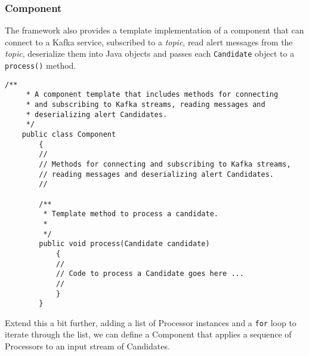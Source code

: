 \documentclass{article}
\newcommand{\kftopic} {\textit{topic}\xspace}
\newcommand{\deserz}    {deserialize\xspace}
\newcommand{\javaname}[1] {{\ttfamily\color{codeblue} #1}}
\newcommand{\javaplural}[1] {\javaname{#1}s}
\begin{document}
\subsubsection{Component}
\label{java-interfaces.Component}

The framework also provides a template implementation of a component that can connect to a Kafka service, subscribed to a \kftopic, read alert messages from the \kftopic, \deserz them into Java objects and passes each \texttt{Candidate} object to a \texttt{process()} method.

\begin{lstlisting}[style=Java]
    /**
     * A component template that includes methods for connecting
     * and subscribing to Kafka streams, reading messages and
     * deserializing alert Candidates.
     */
    public class Component
        {
        //
        // Methods for connecting and subscribing to Kafka streams,
        // reading messages and deserializing alert Candidates.
        //

        /**
         * Template method to process a candidate.
         *
         */
        public void process(Candidate candidate)
            {
            //
            // Code to process a Candidate goes here ...
            //
            }
        }
\end{lstlisting}

Extend this a bit further, adding a list of \javaname{Processor} instances and a \texttt{for} loop to iterate through the list, we can define a \javaname{Component} that applies a sequence of \javaplural{Processor} to an input stream of \javaplural{Candidate}.
\end{document}
